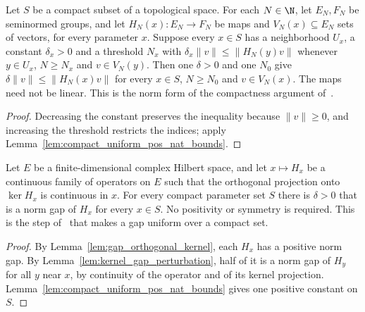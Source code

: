 \begin{lemma}
    \label{lem:gap_compact_tail}
    \leanok
    Let $S$ be a compact subset of a topological space. For each $N\in\N$, let
    $E_N,F_N$ be seminormed groups, and let $H_N(x):E_N\to F_N$ be maps and
    $V_N(x)\subseteq E_N$ sets of vectors, for every parameter $x$. Suppose every
    $x\in S$ has a neighborhood $U_x$, a constant $\delta_x>0$ and a threshold $N_x$ with
    $\delta_x\lVert v\rVert\le\lVert H_N(y)v\rVert$ whenever $y\in U_x$, $N\ge N_x$ and
    $v\in V_N(y)$. Then one $\delta>0$ and one $N_0$ give
    $\delta\lVert v\rVert\le\lVert H_N(x)v\rVert$ for every $x\in S$, $N\ge N_0$ and
    $v\in V_N(x)$. The maps need not be linear. This is the norm form of the
    compactness argument of~\cite[Appendix~A]{Schuch2011Phases}.
\end{lemma}
\begin{proof}\leanok
    Decreasing the constant preserves the inequality because $\lVert v\rVert\ge0$, and
    increasing the threshold restricts the indices; apply
    Lemma~\ref{lem:compact_uniform_pos_nat_bounds}.
\end{proof}

\begin{theorem}
    \label{thm:gap_compact_kernel}
    \leanok
    Let $E$ be a finite-dimensional complex Hilbert space, and let $x\mapsto H_x$ be a
    continuous family of operators on $E$ such that the orthogonal projection onto
    $\ker H_x$ is continuous in $x$. For every compact parameter set $S$ there is
    $\delta>0$ that is a norm gap of $H_x$ for every $x\in S$. No positivity or
    symmetry is required. This is the step of~\cite[Appendix~A, lines
        2575--2578]{Schuch2011Phases} that makes a gap uniform over a compact set.
\end{theorem}
\begin{proof}\leanok
    By Lemma~\ref{lem:gap_orthogonal_kernel}, each $H_x$ has a positive norm gap.
    By Lemma~\ref{lem:kernel_gap_perturbation}, half of it is a norm gap of $H_y$ for
    all $y$ near $x$, by continuity of the operator and of its kernel projection.
    Lemma~\ref{lem:compact_uniform_pos_nat_bounds} gives one positive constant on
    $S$.
\end{proof}

